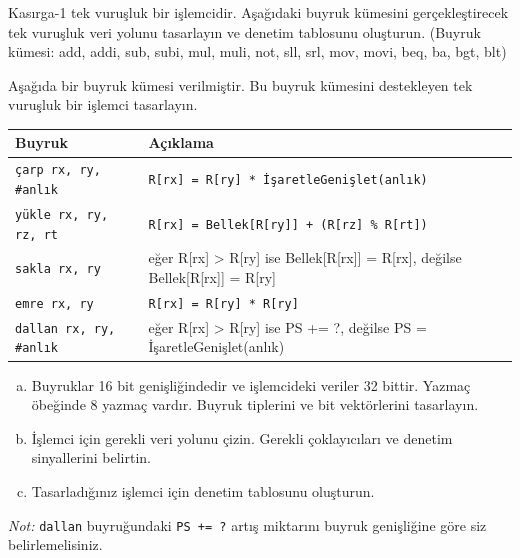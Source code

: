 \begin{alistirma}[\orta]
Kasırga-1 tek vuruşluk bir işlemcidir. Aşağıdaki buyruk kümesini gerçekleştirecek tek vuruşluk veri yolunu tasarlayın ve denetim tablosunu oluşturun. (Buyruk kümesi: add, addi, sub, subi, mul, muli, not, sll, srl, mov, movi, beq, ba, bgt, blt)
\end{alistirma}


\begin{alistirma}[\zor]
Aşağıda bir buyruk kümesi verilmiştir. Bu buyruk kümesini destekleyen tek vuruşluk bir işlemci tasarlayın.

\begin{center}
\begin{tabular}{|l|l|}
\hline
\textbf{Buyruk} & \textbf{Açıklama} \\ \hline
\texttt{çarp rx, ry, \#anlık} & \texttt{R[rx] = R[ry] * İşaretleGenişlet(anlık)} \\ \hline
\texttt{yükle rx, ry, rz, rt} & \texttt{R[rx] = Bellek[R[ry]] + (R[rz] \% R[rt])} \\ \hline
\texttt{sakla rx, ry} & eğer R[rx] > R[ry] ise Bellek[R[rx]] = R[rx], değilse Bellek[R[rx]] = R[ry] \\ \hline
\texttt{emre rx, ry} & \texttt{R[rx] = R[ry] * R[ry]} \\ \hline
\texttt{dallan rx, ry, \#anlık} & eğer R[rx] > R[ry] ise PS += ?, değilse PS = İşaretleGenişlet(anlık) \\ \hline
\end{tabular}
\end{center}

\begin{enumerate}[(a)]
    \item Buyruklar 16 bit genişliğindedir ve işlemcideki veriler 32 bittir. Yazmaç öbeğinde 8 yazmaç vardır. Buyruk tiplerini ve bit vektörlerini tasarlayın.
    \item İşlemci için gerekli veri yolunu çizin. Gerekli çoklayıcıları ve denetim sinyallerini belirtin.
    \item Tasarladığınız işlemci için denetim tablosunu oluşturun.
\end{enumerate}

\emph{Not:} \texttt{dallan} buyruğundaki \texttt{PS += ?} artış miktarını buyruk genişliğine göre siz belirlemelisiniz.
\end{alistirma}

